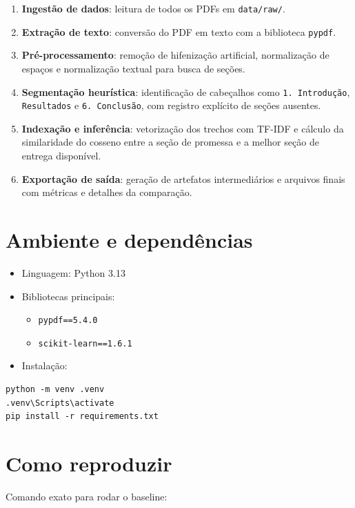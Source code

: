 \documentclass[12pt]{article}
\begin{document}
\begin{enumerate}
    \item \textbf{Ingestão de dados}: leitura de todos os PDFs em \texttt{data/raw/}.
    \item \textbf{Extração de texto}: conversão do PDF em texto com a biblioteca \texttt{pypdf}.
    \item \textbf{Pré-processamento}: remoção de hifenização artificial, normalização de espaços e normalização textual para busca de seções.
    \item \textbf{Segmentação heurística}: identificação de cabeçalhos como \texttt{1. Introdução}, \texttt{Resultados} e \texttt{6. Conclusão}, com registro explícito de seções ausentes.
    \item \textbf{Indexação e inferência}: vetorização dos trechos com TF-IDF e cálculo da similaridade do cosseno entre a seção de promessa e a melhor seção de entrega disponível.
    \item \textbf{Exportação de saída}: geração de artefatos intermediários e arquivos finais com métricas e detalhes da comparação.
\end{enumerate}

\section{Ambiente e dependências}

\begin{itemize}
    \item Linguagem: Python 3.13
    \item Bibliotecas principais:
    \begin{itemize}
        \item \texttt{pypdf==5.4.0}
        \item \texttt{scikit-learn==1.6.1}
    \end{itemize}
    \item Instalação:
\end{itemize}

\begin{verbatim}
python -m venv .venv
.venv\Scripts\activate
pip install -r requirements.txt
\end{verbatim}

\section{Como reproduzir}

Comando exato para rodar o baseline:
\end{document}
